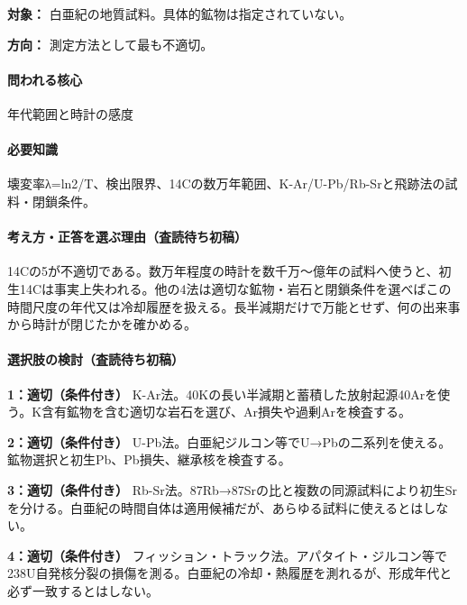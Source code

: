 \noindent\textbf{対象：} 白亜紀の地質試料。具体的鉱物は指定されていない。\par

\noindent\textbf{方向：} 測定方法として最も不適切。\par

\paragraph{問われる核心} 年代範囲と時計の感度

\paragraph{必要知識} 壊変率λ=ln2/T、検出限界、14Cの数万年範囲、K-Ar/U-Pb/Rb-Srと飛跡法の試料・閉鎖条件。

\paragraph{考え方・正答を選ぶ理由（査読待ち初稿）} 14Cの5が不適切である。数万年程度の時計を数千万〜億年の試料へ使うと、初生14Cは事実上失われる。他の4法は適切な鉱物・岩石と閉鎖条件を選べばこの時間尺度の年代又は冷却履歴を扱える。長半減期だけで万能とせず、何の出来事から時計が閉じたかを確かめる。

\paragraph{選択肢の検討（査読待ち初稿）}\mbox{}\par

\noindent\textbf{1：適切（条件付き）} K-Ar法。40Kの長い半減期と蓄積した放射起源40Arを使う。K含有鉱物を含む適切な岩石を選び、Ar損失や過剰Arを検査する。\par

\noindent\textbf{2：適切（条件付き）} U-Pb法。白亜紀ジルコン等でU→Pbの二系列を使える。鉱物選択と初生Pb、Pb損失、継承核を検査する。\par

\noindent\textbf{3：適切（条件付き）} Rb-Sr法。87Rb→87Srの比と複数の同源試料により初生Srを分ける。白亜紀の時間自体は適用候補だが、あらゆる試料に使えるとはしない。\par

\noindent\textbf{4：適切（条件付き）} フィッション・トラック法。アパタイト・ジルコン等で238U自発核分裂の損傷を測る。白亜紀の冷却・熱履歴を測れるが、形成年代と必ず一致するとはしない。\par

